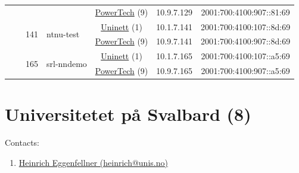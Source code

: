 \begin{small}
\begin{center}
\begin{longtable}{|c|c|c|c|c|c|c|c|}
  &  &  &  & \multicolumn{2}{|c|}{\tiny{\href{http://www.powertech.no}{PowerTech} (9)}} & \tiny{10.9.7.129} & \tiny{2001:700:4100:907::81:69} \\* \cline{3-3}\cline{4-4}\cline{5-5}\cline{6-6}\cline{7-7}\cline{8-8}
  &  & \multirow{2}{*}{\tiny{141}} & \multicolumn{1}{|l|}{\multirow{2}{*}{\tiny{ntnu-test}}} & \multicolumn{2}{|c|}{\tiny{\href{https://www.uninett.no}{Uninett} (1)}} & \tiny{10.1.7.141} & \tiny{2001:700:4100:107::8d:69} \\* \cline{5-5}\cline{6-6}\cline{7-7}\cline{8-8}
  &  &  &  & \multicolumn{2}{|c|}{\tiny{\href{http://www.powertech.no}{PowerTech} (9)}} & \tiny{10.9.7.141} & \tiny{2001:700:4100:907::8d:69} \\* \cline{3-3}\cline{4-4}\cline{5-5}\cline{6-6}\cline{7-7}\cline{8-8}
  &  & \multirow{2}{*}{\tiny{165}} & \multicolumn{1}{|l|}{\multirow{2}{*}{\tiny{srl-nndemo}}} & \multicolumn{2}{|c|}{\tiny{\href{https://www.uninett.no}{Uninett} (1)}} & \tiny{10.1.7.165} & \tiny{2001:700:4100:107::a5:69} \\* \cline{5-5}\cline{6-6}\cline{7-7}\cline{8-8}
  &  &  &  & \multicolumn{2}{|c|}{\tiny{\href{http://www.powertech.no}{PowerTech} (9)}} & \tiny{10.9.7.165} & \tiny{2001:700:4100:907::a5:69} \\ \hline
\end{longtable}
\end{center}
\end{small}



\section{Universitetet på Svalbard (8)}
\label{sec:UNIS}

Contacts:
\begin{enumerate}
 \item {}\href{mailto:heinrich@unis.no}{Heinrich Eggenfellner (heinrich@unis.no)}
\end{enumerate}

